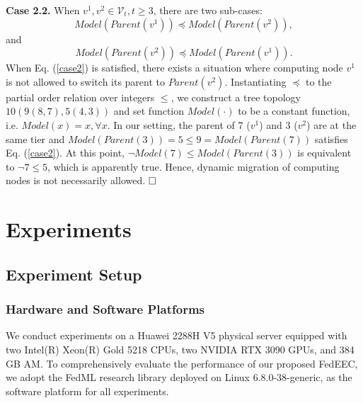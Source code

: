 \documentclass[10pt,journal]{IEEEtran}
\begin{document}
\noindent
\textbf{Case 2.2.} When ${v^1},{v^2} \in {\mathcal{V}_t},t \ge  3$, there are two sub-cases:
\begin{equation}
    Model(Parent(v^1)) \preceq Model(Parent(v^2)),
\end{equation}
and
\begin{equation}
    Model(Parent(v^2)) \preceq Model(Parent(v^1)).
    \label{case2}
\end{equation}
When Eq. (\ref{case2}) is satisfied, there exists a situation where computing node $v^1$ is not allowed to switch its parent to $Parent(v^2)$.
Instantiating $\preceq$ to the partial order relation over integers $\le$, we construct a tree topology $10(9(8,7),5(4,3))$ and set function $Model(\cdot)$ to be a constant function, i.e. $Model(x)=x,\forall x$. 
In our setting, the parent of 7 ($v^1$) and 3 ($v^2$) are at the same tier and $Model(Parent(3))=5\le9=Model(Parent(7))$ satisfies Eq. (\ref{case2}). At this point, $\neg Model(7)\le Model(Parent(3))$ is equivalent to $\neg 7\le 5$, which is apparently true. Hence, dynamic migration of computing nodes is not necessarily allowed.
$\hfill \square$


\section{Experiments}
\subsection{Experiment Setup}
\subsubsection{Hardware and Software Platforms}
We conduct experiments on a Huawei 2288H V5 physical server equipped with two Intel(R) Xeon(R) Gold 5218 CPUs, two NVIDIA RTX 3090 GPUs, and 384 GB AM. To comprehensively evaluate the performance of our proposed FedEEC, we adopt the FedML research library \cite{he2020fedml} deployed on Linux 6.8.0-38-generic, as the software platform for all experiments.
\end{document}

